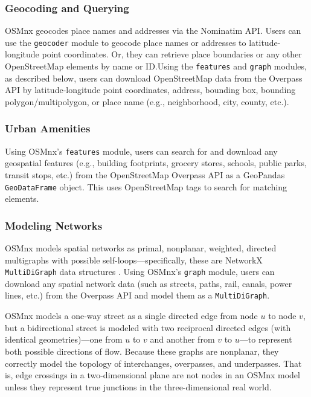 \documentclass[12pt,letterpaper]{article} %
\begin{document}
\subsubsection{Geocoding and Querying}

OSMnx geocodes place names and addresses via the Nominatim API\@. Users can use the \texttt{geocoder} module to geocode place names or addresses to latitude-longitude point coordinates. Or, they can retrieve place boundaries or any other OpenStreetMap elements by name or ID.\@ Using the \texttt{features} and \texttt{graph} modules, as described below, users can download OpenStreetMap data from the Overpass API by latitude-longitude point coordinates, address, bounding box, bounding polygon/multipolygon, or place name (e.g., neighborhood, city, county, etc.).

\subsubsection{Urban Amenities}

Using OSMnx's \texttt{features} module, users can search for and download any geospatial features (e.g., building footprints, grocery stores, schools, public parks, transit stops, etc.) from the OpenStreetMap Overpass API as a GeoPandas \texttt{GeoDataFrame} object. This uses OpenStreetMap tags to search for matching elements.

\subsubsection{Modeling Networks}

OSMnx models spatial networks as primal, nonplanar, weighted, directed multigraphs with possible self-loops---specifically, these are NetworkX \texttt{MultiDiGraph} data structures \citep{hagberg_exploring_2008}. Using OSMnx's \texttt{graph} module, users can download any spatial network data (such as streets, paths, rail, canals, power lines, etc.) from the Overpass API and model them as a \texttt{MultiDiGraph}.

OSMnx models a one-way street as a single directed edge from node $u$ to node $v$, but a bidirectional street is modeled with two reciprocal directed edges (with identical geometries)---one from $u$ to $v$ and another from $v$ to $u$---to represent both possible directions of flow. Because these graphs are nonplanar, they correctly model the topology of interchanges, overpasses, and underpasses. That is, edge crossings in a two-dimensional plane are not nodes in an OSMnx model unless they represent true junctions in the three-dimensional real world.
\end{document}

